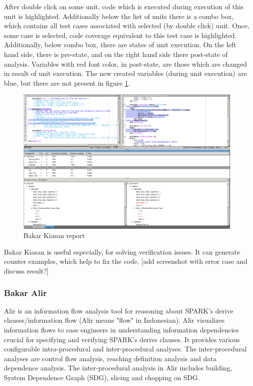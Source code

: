 After double click on some unit, code which is executed during execution of this unit is highlighted. Additionally below the list of units there is a combo box, which contains all test cases associated with selected (by double click) unit. Once, some case is selected, code coverage equivalent to this test case is highlighted. Additionally, below combo box, there are states of unit execution. On the left hand side, there is pre-state, and on the right hand side there post-state of analysis. Variables with red font color, in post-state, are those which are changed in result of unit execution. The new created variables (during unit execution) are blue, but there are not present in figure \ref{figure:kiasan-sample}.

\begin{figure}[ht]%
    \begin{center}
    	\includegraphics[width=1\textwidth]{figures/kiasan-sample.png}
    	\caption{Bakar Kiasan report}
    \end{center}
    \label{figure:kiasan-sample}
\end{figure}

Bakar Kiasan is useful especially, for solving verification issues. It can generate counter examples, which help to fix the code.
[add screenshot with error case and discuss result?]


\subsubsection{Bakar Alir}
Alir is an information flow analysis tool for reasoning about SPARK's derive clauses/information flow (Alir means "flow" in Indonesian). Alir visualizes information flows to ease engineers in understanding information dependencies crucial for specifying and verifying SPARK's derive clauses. It provides various configurable intra-procedural and inter-procedural analyses. The inter-procedural analyses are control flow analysis, reaching definition analysis and data dependence analysis. The inter-procedural analysis in Alir includes building, System Dependence Graph (SDG), slicing and chopping on SDG. \cite{Hari:Thesis}


